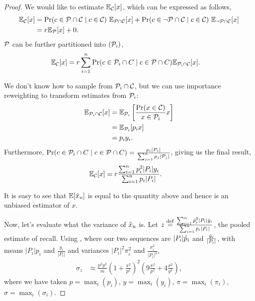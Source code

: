 \begin{proof}
  We would like to estimate $\mathbb{E}_{\mathcal{C}}[x]$, which can be expressed as follows,
  \begin{align*}
    \mathbb{E}_{\mathcal{C}}[x] 
    &= \Pr(c \in \mathcal{P} \cap \mathcal{C} \mid c \in \mathcal{C}) ~ \mathbb{E}_{\mathcal{P} \cap \mathcal{C}}[x] 
    + \Pr(c \in \neg\mathcal{P} \cap \mathcal{C} \mid c \in \mathcal{C}) ~ \mathbb{E}_{\neg\mathcal{P} \cap \mathcal{C} }[x] \\
    &= r \mathbb{E}_{\mathcal{P}}[x] + 0.
  \end{align*}
  $\mathcal{P}$ can be further partitioned into $(\mathcal{P}_i)$,
  \begin{align*}
    \mathbb{E}_{\mathcal{C}}[x] 
    &= r \sum_{i=1}^n \Pr(c \in \mathcal{P}_i \cap C \mid c \in \mathcal{P} \cap C) \mathbb{E}_{\mathcal{P}_i \cap \mathcal{C}}[x].
  \end{align*}

  We don't know how to sample from $\mathcal{P}_i \cap \mathcal{C}$, but we can use importance reweighting to transform estimates from $\mathcal{P}_i$:
  \begin{align*}
    \mathbb{E}_{\mathcal{P}_i \cap \mathcal{C}}[x] 
      &= \mathbb{E}_{\mathcal{P}_i} \left[ \frac{\Pr(x \in \mathcal{C})}{x \in \mathcal{P}_i} x \right] \\
      &= \mathbb{E}_{\mathcal{P}_i}[p_i x] \\
      &= p_i y_i.
  \end{align*}
  Furthermore, $\Pr(c \in \mathcal{P}_i \cap C \mid c \in \mathcal{P} \cap C) = \frac{p_i |\mathcal{P}_i|}{\sum_{j=1}^n p_j |\mathcal{P}_j|}$, giving us the final result,
  \begin{align*}
    \mathbb{E}_{\mathcal{C}}[x] 
    &= r \frac{\sum_{i=1}^n p_i^2 |P_i| y_i}{\sum_{i=1}^n p_i |P_i|}.
  \end{align*}

  It is easy to see that $\mathbb{E}[\hat{x}_u]$ is equal to the quantity above and hence is an unbiased estimator of $x$.

  Now, let's evaluate what the variance of $\hat{x}_u$ is.
  Let $z \stackrel{\rm def}{=} \frac{\sum_{i=1}^n \hat{p}_i^2 |P_i| \hat{y}_i}{\sum_{i=1}^n \hat{p}_i |P_i|}$, the pooled estimate of recall.
  Using , where our two sequences are $|P_i| \hat{p}_i$ and $\frac{\hat{y}_i}{|P_i|}$, with means $|P_i| p_i$ and $\frac{y_i}{|P_i|}$ and variances $|P_i|^2 \pi_i^2$ and $\frac{\sigma_i^2}{|P_i|^2}$,
  \begin{align*}
    \sigma_z &\approx 
        \frac{p^2 y^2}{m} 
        {\left(1 + \frac{\pi^2}{p^2} \right)}^2
        \left(
          9 \frac{\pi^2}{p^2} +
          4 \frac{\sigma^2}{y^2}
          \right),
  \end{align*}
  where we have taken $p = \max_{i}(p_i)$, $y = \max_{i}(y_i)$, $\pi = \max_{i}(\pi_i)$, $\sigma = \max_{i}(\sigma_i)$.


\end{proof}
